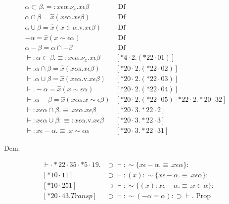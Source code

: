 \documentclass[10pt]{article}
\begin{document}
$$
\begin{array}{lll}
\alpha \subset \beta .=: x \epsilon \alpha . \nu_{x} . x \epsilon \beta & \text { Df } & \\
\alpha \cap \beta=\widehat{x}(x \epsilon \alpha . x \epsilon \beta) & \text { Df } & \\
\alpha \cup \beta=\widehat{x}(x \in \alpha . \mathrm{v} . x \epsilon \beta) & \text { Df } & \\
-\alpha=\widehat{x}(x \sim \epsilon \alpha) & \text { Df } & \\
\alpha-\beta=\alpha \cap-\beta & \text { Df } & \\
\vdash: \alpha \subset \beta . \equiv: x \epsilon \alpha . \nu_{x} . x \epsilon \beta & {[* 4 \cdot 2 .(* 22 \cdot 01)]} \\
\vdash . \alpha \cap \beta=\widehat{x}(x \epsilon \alpha . x \epsilon \beta) & {[* 20 \cdot 2 .(* 22 \cdot 02)]} \\
\vdash . \alpha \cup \beta=\widehat{x}(x \epsilon \alpha . \mathrm{v} . x \epsilon \beta) & {[* 20 \cdot 2 .(* 22 \cdot 03)]} \\
\vdash .-\alpha=\widehat{x}(x \sim \epsilon \alpha) & {[* 20 \cdot 2 .(* 22 \cdot 04)]} \\
\vdash . \alpha-\beta=\widehat{x}(x \epsilon \alpha . x \sim \epsilon \beta) & {[* 20 \cdot 2 .(* 22 \cdot 05) \cdot * 22 \cdot 2 . * 20 \cdot 32]} \\
\vdash: x \epsilon \alpha \cap \beta . \equiv . x \epsilon \alpha . x \epsilon \beta & {[* 20 \cdot 3 . * 22 \cdot 2]} \\
\vdash: x \epsilon \alpha \cup \beta: \equiv: x \epsilon \alpha . \mathrm{v} . x \epsilon \beta & {[* 20 \cdot 3 . * 22 \cdot 3]} \\
\vdash: x \epsilon-\alpha . \equiv . x \sim \epsilon \alpha & {[* 20 \cdot 3 . * 22 \cdot 31]}
\end{array}
$$

Dem.

$$
\begin{array}{ll}
\vdash \cdot * 22 \cdot 35 \cdot * 5 \cdot 19 . & \supset \vdash: \sim\{x \epsilon-\alpha . \equiv . x \epsilon \alpha\}: \\
{[* 10 \cdot 11]} & \supset \vdash:(x): \sim\{x \epsilon-\alpha . \equiv . x \epsilon \alpha\}: \\
{[* 10 \cdot 251]} & \supset \vdash: \sim\{(x): x \epsilon-\alpha . \equiv . x \in \alpha\}: \\
{[* 20 \cdot 43 . T r a n s p]} & \supset \vdash: \sim(-\alpha=\alpha): \supset \vdash . \text { Prop }
\end{array}
$$
\end{document}
